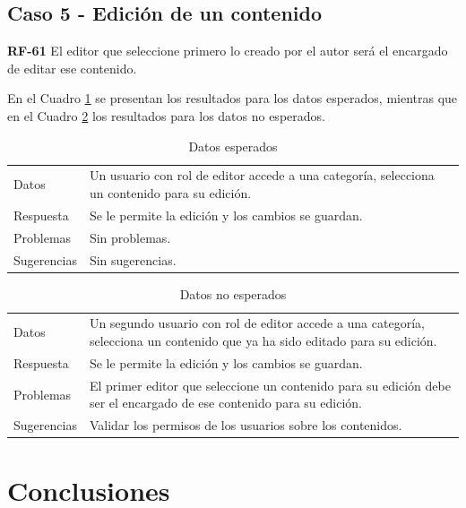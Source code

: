 \documentclass[10pt,times,twocolumn]{article}
\begin{document}
\subsection{Caso 5 - Edición de un contenido}

\textbf{RF-61} El editor que seleccione primero lo creado por el autor será el encargado de editar ese contenido. 

En el Cuadro \ref{tab:caso5_esperado} se presentan los resultados para los datos esperados, mientras que en el Cuadro \ref{tab:caso5_no_esperado} los resultados para los datos no esperados.

\begin{table}[H]
    \centering
    \begin{tabular}{p{3cm}p{4cm}}
        \rowcolor{gray!15}
        Datos & Un usuario con rol de editor accede a una categoría, selecciona un contenido para su edición.\\
       	Respuesta & Se le permite la edición y los cambios se guardan.\\
       	Problemas & Sin problemas.\\
       	Sugerencias & Sin sugerencias.\\
    \end{tabular}
    \caption{Datos esperados}
    \label{tab:caso5_esperado}
\end{table}

\begin{table}[H]
    \centering
    \begin{tabular}{p{3cm}p{4cm}}
        \rowcolor{gray!15}
        Datos & Un segundo usuario con rol de editor accede a una categoría, selecciona un contenido que ya ha sido editado para su edición.\\
        Respuesta & Se le permite la edición y los cambios se guardan.\\
       	Problemas & El primer editor que seleccione un contenido para su edición debe ser el encargado de ese contenido para su edición.\\
       	Sugerencias & Validar los permisos de los usuarios sobre los contenidos.\\
    \end{tabular}
    \caption{Datos no esperados}
    \label{tab:caso5_no_esperado}
\end{table}

\section{Conclusiones}

\printbibliography
\end{document}
